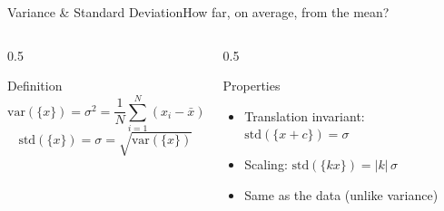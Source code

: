 \documentclass[aspectratio=169,11pt]{beamer}
\begin{document}
\begin{frame}{Variance \& Standard Deviation}{How far, on average, from the mean?}
  \begin{columns}[T]
    \begin{column}{0.5\textwidth}
      \begin{block}{Definition}
        \[ \text{var}(\{x\}) = \sigma^2 = \frac{1}{N}\sum_{i=1}^N (x_i - \bar x)^2 \]
        \[ \text{std}(\{x\}) = \sigma = \sqrt{\text{var}(\{x\})} \]
      \end{block}
    \end{column}
    \begin{column}{0.5\textwidth}
      \begin{exampleblock}{Properties}
        \small
        \begin{itemize}
          \item Translation invariant: $\text{std}(\{x+c\})=\sigma$
          \item Scaling: $\text{std}(\{kx\}) = |k|\,\sigma$
          \item Same  as the data (unlike variance)
        \end{itemize}
      \end{exampleblock}
    \end{column}
  \end{columns}
\end{frame}
\end{document}
